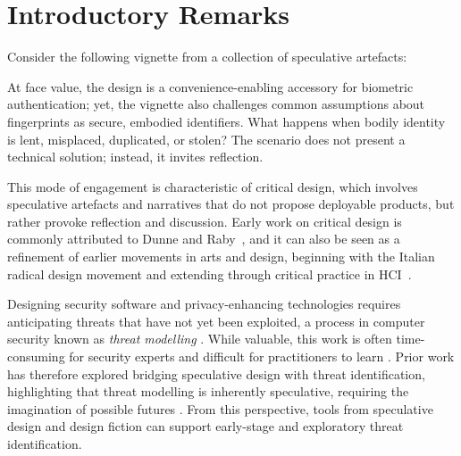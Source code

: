 

\section{Introductory Remarks}



Consider the following vignette from a collection of speculative artefacts:


At face value, the design is a convenience-enabling accessory for biometric authentication; yet, the vignette also challenges common assumptions about fingerprints as secure, embodied identifiers. What happens when bodily identity is lent, misplaced, duplicated, or stolen? The scenario does not present a technical solution; instead, it invites reflection. 

This mode of engagement is characteristic of critical design, which involves speculative artefacts and narratives that do not propose deployable products, but rather provoke reflection and discussion. Early work on critical design is commonly attributed to Dunne and Raby~\cite{DuRa01,Dun05}, and it can also be seen as a refinement of earlier movements in arts and design, beginning with the Italian radical design movement and extending through critical practice in HCI~\cite{Mal17}. 

Designing security software and privacy-enhancing technologies requires anticipating threats that have not yet been exploited, a process in computer security known as \textit{threat modelling} \cite{shostack2014threat}. While valuable, this work is often time-consuming for security experts and difficult for practitioners to learn \cite{shostack_fast_cheap_good}. Prior work has therefore explored bridging speculative design with threat identification, highlighting that threat modelling is inherently speculative, requiring the imagination of possible futures \cite{merrill2020security}. From this perspective, tools from speculative design and design fiction can support early-stage and exploratory threat identification.

